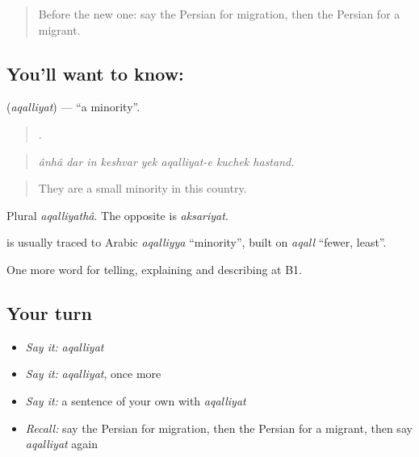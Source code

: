 \label{lesson:FA-C387-aqalliyyat}



\begin{quote}
Before the new one: say the Persian for migration, then the Persian for a migrant.
\end{quote}

\subsection*{You'll want to know: }
\textbf{} (\emph{aqalliyat}) — \textquotedblleft{}a minority\textquotedblright{}.

\begin{quote}
       .
\end{quote}

\begin{quote}
\emph{ânhâ dar in keshvar yek aqalliyat-e kuchek hastand.}
\end{quote}

\begin{quote}
They are a small minority in this country.
\end{quote}

Plural \emph{aqalliyathâ}. The opposite is \emph{aksariyat}.

\begin{cousinweb}
\textbf{} is usually traced to Arabic \emph{aqalliyya} \textquotedblleft{}minority\textquotedblright{}, built on \emph{aqall} \textquotedblleft{}fewer, least\textquotedblright{}.
\end{cousinweb}

\begin{grammarlens}[title={What you've built}]
One more word for telling, explaining and describing at B1.
\end{grammarlens}

\subsection*{Your turn}
\begin{itemize}
\raggedright
  \item \emph{Say it:} \emph{aqalliyat}
  \item \emph{Say it:} \emph{aqalliyat}, once more
  \item \emph{Say it:} a sentence of your own with \emph{aqalliyat}
  \item \emph{Recall:} say the Persian for migration, then the Persian for a migrant, then say \emph{aqalliyat} again
\end{itemize}

